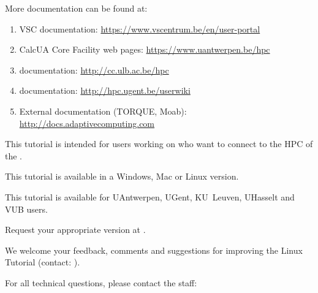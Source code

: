 More documentation can be found at:

\begin{enumerate}
  \item  VSC documentation: \url{https://www.vscentrum.be/en/user-portal}
  \ifantwerpen
    \item CalcUA Core Facility web pages: \url{https://www.uantwerpen.be/hpc}
  \fi
  \ifbrussel
    \item \hpcname documentation: \url{http://cc.ulb.ac.be/hpc}
  \fi
  \ifgent
    \item \hpcname documentation: \url{http://hpc.ugent.be/userwiki}
  \fi
  \item  External documentation (TORQUE, \gls{Moab}): \url{http://docs.adaptivecomputing.com}
\end{enumerate}

This tutorial is intended for users working on \strong{\OS} who want to connect to the HPC of the \strong{\university}.

This tutorial is available in a Windows, Mac or Linux version.

This tutorial is available for UAntwerpen, UGent, KU~Leuven, UHasselt and VUB users.

Request your appropriate version at \hpcinfo.


We welcome your feedback, comments and suggestions for improving the Linux
Tutorial  (contact: \hpcinfo).

For all technical questions, please contact the \hpc staff:

